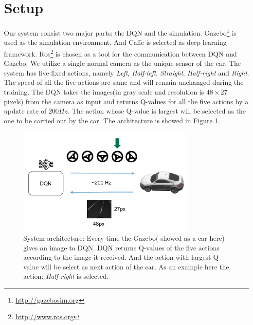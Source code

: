 
\section{Setup} \label{sec:setup}

Our system consist two major parts: the DQN and the simulation. Gazebo\footnote{\url{http://gazebosim.org}} is used as the simulation environment. And Caffe\cite{jia2014caffe} is selected as deep learning framework. Ros\footnote{\url{http://www.ros.org}} is chosen as a tool for the communication between DQN and Gazebo. We utilize a single normal camera as the unique sensor of the car. The system has five fixed actions, namely \textit{Left}, \textit{Half-left}, \textit{Straight}, \textit{Half-right} and \textit{Right}. The speed of all the five actions are same and will remain unchanged during the training. The DQN takes the images(in gray scale and resolution is $ 48 \times 27 $ pixels) from the camera as input and returns Q-values for all the five actions by a update rate of $ 200 Hz $. The action whose Q-value is largest will be selected as the one to be carried out by the car. The architecture is showed in Figure \ref{fig:archi}.

\begin{figure}[!t]
	\centering
	\includegraphics[width=3.5in]{../presentation/archi} 
	\caption{System architecture: Every time the Gazebo( showed as a car here) gives an image to DQN. DQN returns Q-values of the five actions according to the image it received. And the action with largest Q-value will be select as next action of the car. As an example here the action: \textit{Half-right} is selected.}
	\label{fig:archi}
\end{figure}